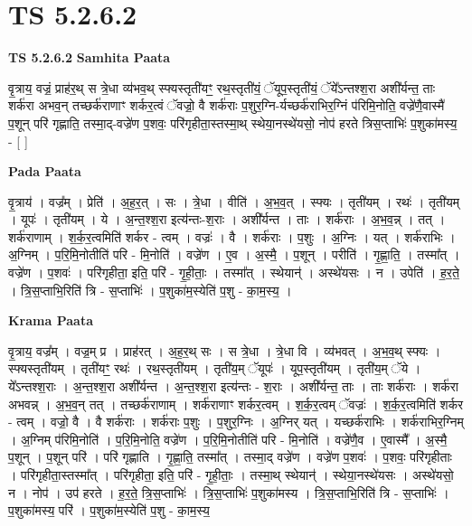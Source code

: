 \documentclass[17pt]{extarticle}
\begin{document}
\section{ TS 5.2.6.2 }

\textbf{TS 5.2.6.2 } \newline
\textbf{Samhita Paata} \newline

वृ॒त्राय॒ वज्रं॒ प्राह॑र॒थ् स त्रे॒धा व्य॑भव॒थ् स्फ्यस्तृती॑यꣳ॒॒ रथ॒स्तृती॑यं॒ ॅयूप॒स्तृती॑यं॒ ॅये᳚ऽन्तश्श॒रा अशी᳚र्यन्त॒ ताः शर्क॑रा अभव॒न् तच्छर्क॑राणाꣳ शर्कर॒त्वं ॅवज्रो॒ वै शर्क॑राः प॒शुर॒ग्नि-र्यच्छर्क॑राभिर॒ग्निं प॑रिमि॒नोति॒ वज्रे॑णै॒वास्मै॑ प॒शून् परि॑ गृह्णाति॒ तस्मा॒द्-वज्रे॑ण प॒शवः॒ परि॑गृहीता॒स्तस्मा॒थ् स्थेया॒नस्थे॑यसो॒ नोप॑ हरते त्रिस॒प्ताभिः॑ प॒शुका॑मस्य॒ - [  ] \newline

\textbf{Pada Paata} \newline

वृ॒त्राय॑ । वज्र᳚म् । प्रेति॑ । अ॒ह॒र॒त् । सः । त्रे॒धा । वीति॑ । अ॒भ॒व॒त् । स्फ्यः । तृती॑यम् । रथः॑ । तृती॑यम् । यूपः॑ । तृती॑यम् । ये । अ॒न्त॒श्श॒रा इत्य॑न्तः-श॒राः । अशी᳚र्यन्त । ताः । शर्क॑राः । अ॒भ॒व॒न्न् । तत् । शर्क॑राणाम् । श॒र्क॒र॒त्वमिति॑ शर्कर - त्वम् । वज्रः॑ । वै । शर्क॑राः । प॒शुः । अ॒ग्निः । यत् । शर्क॑राभिः । अ॒ग्निम् । प॒रि॒मि॒नोतीति॑ परि - मि॒नोति॑ । वज्रे॑ण । ए॒व । अ॒स्मै॒ । प॒शून् । परीति॑ । गृ॒ह्णा॒ति॒ । तस्मा᳚त् । वज्रे॑ण । प॒शवः॑ । परि॑गृहीता॒ इति॒ परि॑ - गृ॒ही॒ताः॒ । तस्मा᳚त् । स्थेयान्॑ । अस्थे॑यसः । न । उपेति॑ । ह॒र॒ते॒ । त्रि॒स॒प्ताभि॒रिति॑ त्रि - स॒प्ताभिः॑ । प॒शुका॑म॒स्येति॑ प॒शु - का॒म॒स्य॒ ।  \newline


\textbf{Krama Paata} \newline

वृ॒त्राय॒ वज्र᳚म् । वज्र॒म् प्र । प्राह॑रत् । अ॒ह॒र॒थ् सः । स त्रे॒धा । त्रे॒धा वि । व्य॑भवत् । अ॒भ॒व॒थ् स्फ्यः । स्फ्यस्तृती॑यम् । तृती॑यꣳ॒॒ रथः॑ । रथ॒स्तृती॑यम् । तृती॑य॒म् ॅयूपः॑ । यूप॒स्तृती॑यम् । तृती॑य॒म् ॅये । ये᳚ऽन्तश्श॒राः । अ॒न्त॒श्श॒रा अशी᳚र्यन्त । अ॒न्त॒श्श॒रा इत्य॑न्तः - श॒राः । अशी᳚र्यन्त॒ ताः । ताः शर्क॑राः । शर्क॑रा अभवन्न् । अ॒भ॒व॒न् तत् । तच्छर्क॑राणाम् । शर्क॑राणाꣳ शर्कर॒त्वम् । श॒र्क॒र॒त्वम् ॅवज्रः॑ । श॒र्क॒र॒त्वमिति॑ शर्कर - त्वम् । वज्रो॒ वै । वै शर्क॑राः । शर्क॑राः प॒शुः । प॒शुर॒ग्निः । अ॒ग्निर् यत् । यच्छर्क॑राभिः । शर्क॑राभिर॒ग्निम् । अ॒ग्निम् प॑रिमि॒नोति॑ । प॒रि॒मि॒नोति॒ वज्रे॑ण । प॒रि॒मि॒नोतीति॑ परि - मि॒नोति॑ । वज्रे॑णै॒व । ए॒वास्मै᳚ । अ॒स्मै॒ प॒शून् । प॒शून् परि॑ । परि॑ गृह्णाति । गृ॒ह्णा॒ति॒ तस्मा᳚त् । तस्मा॒द् वज्रे॑ण । वज्रे॑ण प॒शवः॑ । प॒शवः॒ परि॑गृहीताः । परि॑गृहीता॒स्तस्मा᳚त् । परि॑गृहीता॒ इति॒ परि॑ - गृ॒ही॒ताः॒ । तस्मा॒थ् स्थेयान्॑ । स्थेया॒नस्थे॑यसः । अस्थे॑यसो॒ न । नोप॑ । उप॑ हरते । ह॒र॒ते॒ त्रि॒स॒प्ताभिः॑ । त्रि॒स॒प्ताभिः॑ प॒शुका॑मस्य । त्रि॒स॒प्ताभि॒रिति॑ त्रि - स॒प्ताभिः॑ । प॒शुका॑मस्य॒ परि॑ । प॒शुका॑म॒स्येति॑ प॒शु - का॒म॒स्य॒ \newline
\end{document}
